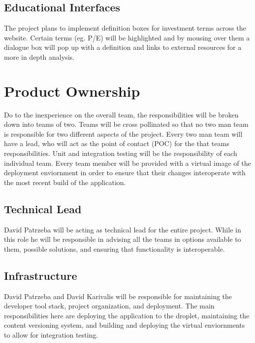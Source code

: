 \documentclass[11pt,letterpaper,oneside]{memoir}
\begin{document}
\section{Educational Interfaces}

The project plans to implement definition boxes for investment terms across the website.
Certain terms (eg. P/E) will be highlighted and by mousing over them a dialogue box will pop
up with a definition and links to external resources for a more in depth analysis.

\chapter{Product Ownership}

Do to the inexperience on the overall team, the responsibilities will be broken down into teams of two.
Teams will be cross pollinated so that no two man team is responsible for two different aspects of the
project. Every two man team will have a lead, who will act as the point of contact (POC) for the that
teams responsibilities. Unit and integration testing will be the responsibility of each individual team.
Every team member will be provided with a virtual image of the deployment enviornment in order to ensure
that their changes interoperate with the most recent build of the application.

\section{Technical Lead}

David Patrzeba will be acting as technical lead for the entire project. While in this role he will be
responsible in advising all the teams in options available to them, possible solutions, and ensuring
that functionality is interoperable.

\section{Infrastructure}

David Patrzeba and David Karivalis will be responsible for maintaining the developer tool stack,
project organization, and deployment. The main responsibilities here are deploying the application
to the droplet, maintaining the content versioning system, and building and deploying the virtual
enviornments to allow for integration testing.
\end{document}
